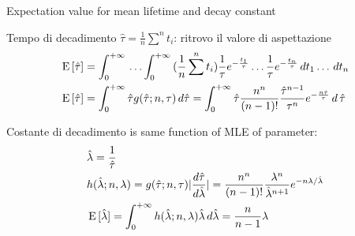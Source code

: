 \documentclass[asd-beamer.tex]{subfiles}%
\begin{document}
\begin{frame}{Expectation value for mean lifetime and decay constant}
\begin{block}{Tempo di decadimento}
$\hat{\tau}=\frac{1}{n}\sum^nt_i$: ritrovo il valore di aspettazione
\begin{align*}
&\operatorname{E}{[\hat{\tau}]}=\int_{0}^{+\infty}{}\ldots\int_{0}^{+\infty}{}(\frac{1}{n}\sum^nt_i)\frac{1}{\tau}e^{-\frac{t_1}{\tau}}\ldots\frac{1}{\tau}e^{-\frac{t_n}{\tau}}\,dt_1\ldots\,dt_n\\
&\operatorname{E}{[\hat{\tau}]}=\int_{0}^{+\infty}{}\hat{\tau}g(\hat{\tau};n,\tau)\,d\hat{\tau}=\int_{0}^{+\infty}{}\hat{\tau}\frac{n^n}{(n-1)!}\frac{\hat{\tau}^{n-1}}{\tau^n}e^{-\frac{n\hat{\tau}}{\tau}}\,d\,\hat{\tau}
\end{align*}
\end{block}
\begin{block}{Costante di decadimento}
 is same function of MLE of parameter:
\begin{align*}
&\hat{\lambda}=\frac{1}{\hat{\tau}}\\
&h(\hat{\lambda};n,\lambda)=g(\hat{\tau};n,\tau)|\frac{d \hat{\tau}}{d \hat{\lambda}}|=\frac{n^n}{(n-1)!}\frac{\lambda^n}{\hat{\lambda}^{n+1}}e^{-n\lambda/\hat{\lambda}}\\
&\operatorname{E}{[\hat{\lambda}]}=\int_{0}^{+\infty}{}h(\hat{\lambda};n,\lambda)\hat{\lambda}\,d\hat{\lambda}=\frac{n}{n-1}\lambda
\end{align*}
\end{block}
\end{frame}
\end{document}
